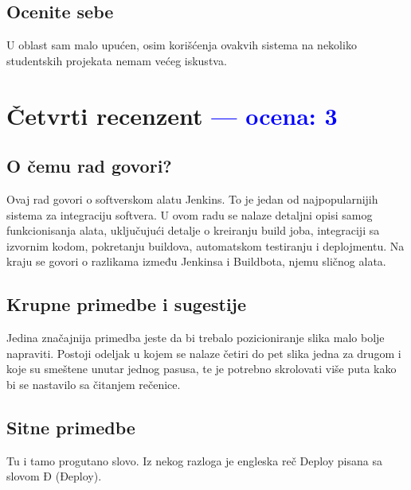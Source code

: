 \documentclass[a4paper]{report}
\newcommand{\odgovor}[1]{\textcolor{blue}{#1}}
\begin{document}
\section{Ocenite sebe}

U oblast sam malo upućen, osim korišćenja ovakvih sistema na nekoliko studentskih projekata nemam većeg iskustva.


\chapter{Četvrti recenzent \odgovor{--- ocena: 3} }
\section{O čemu rad govori?}
Ovaj rad govori o softverskom alatu Jenkins. To je jedan od najpopularnijih sistema za integraciju softvera. U ovom radu se nalaze detaljni opisi samog funkcionisanja alata, uključujući detalje o kreiranju build joba, integraciji sa izvornim kodom, pokretanju buildova, automatskom testiranju i deplojmentu. Na kraju se govori o razlikama između Jenkinsa i Buildbota, njemu sličnog alata.


\section{Krupne primedbe i sugestije}
Jedina značajnija primedba jeste da bi trebalo pozicioniranje slika malo bolje napraviti. Postoji odeljak u kojem se nalaze četiri do pet slika jedna za drugom i koje su smeštene unutar jednog pasusa, te je potrebno skrolovati više puta kako bi se nastavilo sa čitanjem rečenice.

\section{Sitne primedbe}
Tu i tamo progutano slovo. Iz nekog razloga je engleska reč Deploy pisana sa slovom Đ (Đeploy).
\end{document}
